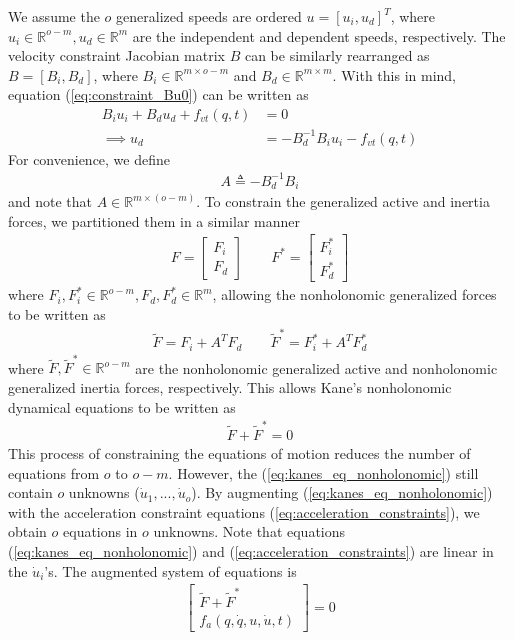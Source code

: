 We assume the $o$ generalized speeds are ordered $u = [u_i, u_d]^T$, where
$u_i\in\mathbb{R}^{o-m}, u_d\in\mathbb{R}^{m}$ are the independent and
dependent speeds, respectively. The velocity constraint Jacobian matrix $B$ can
be similarly rearranged as $B = [B_i, B_d]$, where $B_i\in \mathbb{R}^{m \times
o-m}$ and $B_d \in \mathbb{R}^{m \times m}$. With this in mind, equation
(\ref{eq:constraint_Bu0}) can be written as
\begin{align}
{B}_i {u}_i + {B}_d {u}_d + f_{vt}({q}, t) &= 0 \\
\implies {u}_d &= -{B}_d^{-1} {B}_i {u}_i - f_{vt}({q}, t)
\end{align}
For convenience, we define
\begin{align}
\label{eq:constraint_A}
A \triangleq - B_{d}^{-1} {B}_i
\end{align}
and note that $A\in\mathbb{R}^{m \times (o - m)}$. To constrain the
generalized active and inertia forces, we partitioned them in a similar
manner
\begin{align}
\label{eq:F_Fstar_rewrite}
F = \begin{bmatrix} F_i \\ F_d \end{bmatrix} \quad
\quad F^* = \begin{bmatrix} F^*_i \\ F^*_d
\end{bmatrix}
\end{align}
where $F_i, F_i^*\in\mathbb{R}^{o-m}, F_d, F_d^*\in\mathbb{R}^{m}$, allowing
the nonholonomic generalized forces to be written as
\begin{align}
\label{eq:F_Fstar_nonholonomic}
\tilde{F} = F_i + A^T F_d \quad \quad
\tilde{F}^* = F_i^* + A^T F_d^*
\end{align}
where $\tilde{F}, \tilde{F}^*\in\mathbb{R}^{o-m}$ are the nonholonomic
generalized active and nonholonomic generalized inertia forces, respectively.
This allows Kane's nonholonomic dynamical equations to be written as
\begin{align}
\label{eq:kanes_eq_nonholonomic}
\tilde{F} + \tilde{F}^* = 0
\end{align}
This process of constraining the equations of motion reduces the number of
equations from $o$ to $o-m$. However, the (\ref{eq:kanes_eq_nonholonomic})
still contain $o$ unknowns ($\dot{u}_1,...,\dot{u}_o$). By augmenting
(\ref{eq:kanes_eq_nonholonomic}) with the acceleration constraint equations
(\ref{eq:acceleration_constraints}), we obtain $o$ equations in $o$ unknowns.
Note that equations (\ref{eq:kanes_eq_nonholonomic}) and
(\ref{eq:acceleration_constraints}) are linear in the $\dot{u}_i$'s. The
augmented system of equations is
\begin{align}
\label{eq:F_Fstar_f_a}
\begin{bmatrix}
\tilde{F} + \tilde{F}^* \\
f_a (q, \dot{q}, u, \dot{u}, t)
\end{bmatrix} = 0
\end{align}

